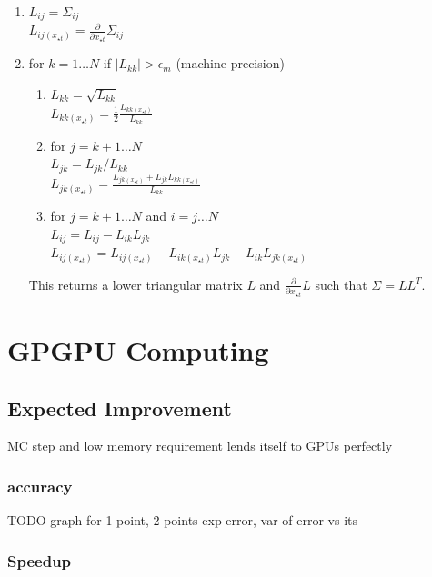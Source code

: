 \documentclass[phd,tocprelim]{cornell}
\begin{document}
\begin{enumerate}
 \item $L_{ij} = \Sigma_{ij}$ \\
       $L_{ij (x_{\star t})} = \frac{\partial}{\partial x_{\star t}} \Sigma_{ij}$
 \item for $k = 1\ldots N$ if $|L_{kk}| > \epsilon_{m}$ (machine precision)
 \begin{enumerate}
  \item $L_{kk} = \sqrt{L_{kk}}$ \\
	$L_{kk (x_{\star t})} = \frac{1}{2} \frac{L_{kk (x_{\star t})}}{L_{kk}}$
  \item for $j = k+1\ldots N$ \\
	$L_{jk} = L_{jk}/L_{kk}$ \\
	$L_{jk (x_{\star t})} = \frac{L_{jk (x_{\star t})} + L_{jk}L_{kk (x_{\star t})}}{L_{kk}}$
  \item for $j = k+1\ldots N$ and $i = j\ldots N$ \\
	$L_{ij} = L_{ij} - L_{ik}L_{jk}$ \\
	$L_{ij (x_{\star t})} = L_{ij (x_{\star t})} - L_{ik (x_{\star t})}L_{jk} - L_{ik}L_{jk (x_{\star t})}$
 \end{enumerate}

This returns a lower triangular matrix $L$ and $\frac{\partial}{\partial x_{\star t}} L$ such that $\Sigma = LL^{T}$.

\end{enumerate}

\section{GPGPU Computing} %
\label{sec:GPGPU Computing}

\subsection{Expected Improvement}

MC step and low memory requirement lends itself to GPUs perfectly

\subsubsection{accuracy}

TODO
graph for 1 point, 2 points exp error, var of error vs its

\subsubsection{Speedup}
\end{document}
